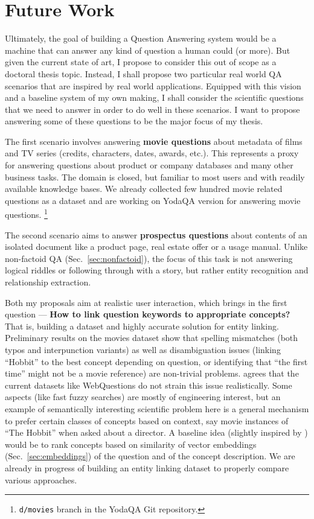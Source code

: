 \chapter{Future Work}
\label{ch:plan}

Ultimately, the goal of building a Question Answering system would
be a machine that can answer any kind of question a human could (or more).
But given the current state of art, I propose to consider this out of
scope as a doctoral thesis topic.  Instead, I shall propose two particular
real world QA scenarios that are inspired by real world applications.
Equipped with this vision and a baseline system of my own making,
I shall consider the scientific questions that we need
to answer in order to do well in these scenarios.  I want to propose
answering some of these questions to be the major focus of my thesis.

The first scenario involves answering \textbf{movie questions}
about metadata of films and TV series (credits, characters, dates,
awards, etc.).  This represents a proxy for answering questions about
product or company databases and many other business tasks.  The domain
is closed, but familiar to most users and with readily available knowledge
bases.  We already collected few hundred movie related questions as a dataset
and are working on YodaQA version for answering movie questions.%
\footnote{\texttt{d/movies} branch in the YodaQA Git repository.}

The second scenario aims to answer \textbf{prospectus questions}
about contents of an isolated document like a product page,
real estate offer or a usage manual.  Unlike non-factoid QA (Sec.~\ref{sec:nonfactoid}),
the focus of this task is not answering logical riddles or following
through with a story, but rather entity recognition and relationship
extraction.

Both my proposals aim at realistic user interaction,
which brings in the first question ---
\textbf{How to link question keywords to appropriate concepts?}
That is, building a dataset and highly accurate solution for entity
linking. %
Preliminary results on the movies dataset show that spelling mismatches
(both typos and interpunction variants) as well as disambiguation issues
(linking ``Hobbit'' to the best concept depending on question,
or identifying that ``the first time'' might not be a movie reference)
are non-trivial problems.
\cite{LeanFreebaseYao} agrees that the current
datasets like WebQuestions do not strain this issue realistically.
Some aspects (like fast fuzzy searches) are mostly of engineering interest,
but an example of semantically interesting scientific problem here
is a general mechanism to prefer certain classes of concepts based
on context, say movie instances of ``The Hobbit'' when asked about a director.
A baseline idea (slightly inspired by \cite{QuASE}) would be to rank concepts
based on similarity of vector embeddings (Sec.~\ref{sec:embeddings})
of the question and of the concept description.
We are already in progress of building an entity linking dataset to properly
compare various approaches.

